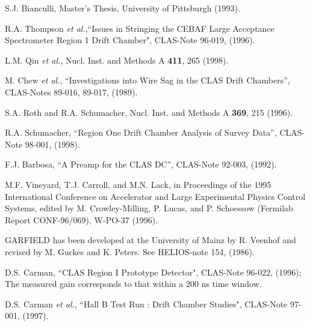 \begin{thebibliography}{99}
S.J. Bianculli, Master's Thesis, University of Pittsburgh (1993).

R.A. Thompson {\it et al.},``Issues in Stringing the CEBAF Large 
Acceptance Spectrometer Region 1 Drift Chamber", CLAS-Note 96-019, 
(1996).

 L.M. Qin {\it et al.}, Nucl. Inst. and Methods A {\bf 411}, 265 (1998).

 M. Chew {\it et al.}, ``Investigations into Wire Sag in the
CLAS Drift Chambers'', CLAS-Notes 89-016, 89-017, (1989).

S.A. Roth and R.A. Schumacher, Nucl. Inst. and Methods A {\bf 369}, 215 (1996).

R.A. Schumacher, ``Region One Drift Chamber Analysis of Survey Data'',
CLAS-Note 98-001, (1998).

F.J. Barbosa, ``A Preamp for the CLAS DC'', CLAS-Note 92-003, (1992).

M.F. Vineyard, T.J. Carroll, and M.N. Lack, in Proceedings of the 1995 International
Conference on Accelerator and Large Experimental Physics Control Systems, 
edited by M. Crowley-Milling, P. Lucas, and P. Schoessow (Fermilab Report 
CONF-96/069), W-PO-37 (1996).

GARFIELD has been developed at the University of Mainz by R. Veenhof and
revised by M. Guckes and K. Peters.  See HELIOS-note 154, (1986).

D.S. Carman, ``CLAS Region I Prototype Detector", CLAS-Note 96-022,
(1996); The measured gain corresponds to that within a 200 ns time window.

D.S. Carman {\it et al.}, ``Hall B Test Run : Drift Chamber Studies", CLAS-Note
97-001, (1997).

\end{thebibliography}
